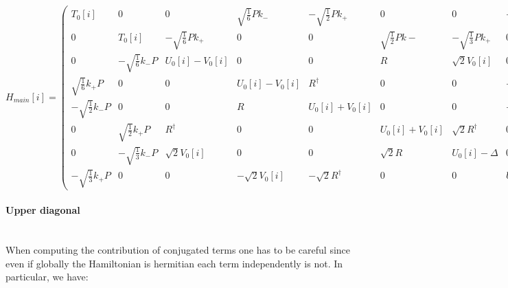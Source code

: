 \documentclass[prb,aps]{revtex4}
\begin{document}
	\begin{equation}
	    \renewcommand{\arraystretch}{3.5}
	    H_{main}[i] =
	    \begin{pmatrix}
			T_0[i] & 0 & 0 &\sqrt{\frac16} P k_- & -\sqrt{\frac12} P k_+ & 0 & 0 & -\sqrt{\frac13} P k_-\\
			0 & T_0[i] & -\sqrt{\frac16} P k_+ & 0 & 0 & \sqrt{\frac12} P k- & -\sqrt{\frac13} P k_+ & 0\\
			0 & -\sqrt{\frac16} k_- P & U_0[i] - V_0[i] & 0 & 0 & R & \sqrt{2} V_0[i] & 0 \\
			\sqrt{\frac16} k_+ P & 0 & 0 & U_0[i] - V_0[i] & R^\dagger & 0 & 0 & -\sqrt{2} V_0[i]\\
			-\sqrt{\frac12}  k_- P & 0 & 0 & R & U_0[i] + V_0[i] & 0  & 0 & -\sqrt2 R\\
			0 & \sqrt{\frac12} k_+ P & R^\dagger & 0 & 0 & U_0[i] + V_0[i] & \sqrt{2} R^\dag & 0 \\
			0 & -\sqrt{\frac13} k_- P & \sqrt{2} V_0[i] & 0 & 0 & \sqrt2 R & U_0[i] - Δ & 0\\
			-\sqrt{\frac13} k_+ P & 0 & 0 & -\sqrt{2} V_0[i] & -\sqrt{2} R^\dag & 0 & 0 & U_0[i] - Δ
		\end{pmatrix}
    \end{equation}
	
	
	\paragraph{Upper diagonal\\\\}
	
	When computing the contribution of conjugated terms one has to be careful since even if globally the Hamiltonian is hermitian each term independently is not. In particular, we have:
	
\end{document}
